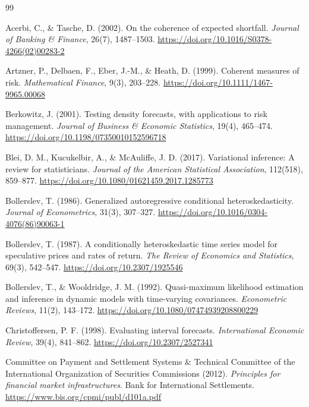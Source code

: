 \documentclass[12pt,a4paper]{article}
\theoremstyle{definition}
\theoremstyle{remark}
\begin{document}
\renewcommand{\refname}{Tài liệu tham khảo}
\begin{thebibliography}{99}
\setlength{\itemsep}{2pt}

 Acerbi, C., \& Tasche, D. (2002). On the coherence of expected shortfall. \emph{Journal of Banking \& Finance}, 26(7), 1487--1503. \url{https://doi.org/10.1016/S0378-4266(02)00283-2}

 Artzner, P., Delbaen, F., Eber, J.-M., \& Heath, D. (1999). Coherent measures of risk. \emph{Mathematical Finance}, 9(3), 203--228. \url{https://doi.org/10.1111/1467-9965.00068}

 Berkowitz, J. (2001). Testing density forecasts, with applications to risk management. \emph{Journal of Business \& Economic Statistics}, 19(4), 465--474. \url{https://doi.org/10.1198/07350010152596718}

 Blei, D. M., Kucukelbir, A., \& McAuliffe, J. D. (2017). Variational inference: A review for statisticians. \emph{Journal of the American Statistical Association}, 112(518), 859--877. \url{https://doi.org/10.1080/01621459.2017.1285773}

 Bollerslev, T. (1986). Generalized autoregressive conditional heteroskedasticity. \emph{Journal of Econometrics}, 31(3), 307--327. \url{https://doi.org/10.1016/0304-4076(86)90063-1}

 Bollerslev, T. (1987). A conditionally heteroskedastic time series model for speculative prices and rates of return. \emph{The Review of Economics and Statistics}, 69(3), 542--547. \url{https://doi.org/10.2307/1925546}

 Bollerslev, T., \& Wooldridge, J. M. (1992). Quasi-maximum likelihood estimation and inference in dynamic models with time-varying covariances. \emph{Econometric Reviews}, 11(2), 143--172. \url{https://doi.org/10.1080/07474939208800229}

 Christoffersen, P. F. (1998). Evaluating interval forecasts. \emph{International Economic Review}, 39(4), 841--862. \url{https://doi.org/10.2307/2527341}

 Committee on Payment and Settlement Systems \& Technical Committee of the International Organization of Securities Commissions (2012). \emph{Principles for financial market infrastructures}. Bank for International Settlements. \url{https://www.bis.org/cpmi/publ/d101a.pdf}


\end{thebibliography}
\end{document}
